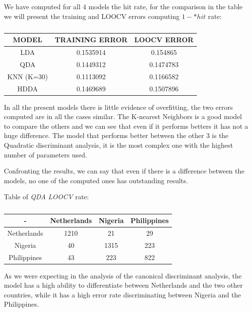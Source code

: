 \documentclass[
  11pt,
]{article}
\begin{document}
We have computed for all 4 models the hit rate, for the comparison in the table we will present the training and LOOCV errors computing \(1-*hit\) rate:

\begin{table}[h!]
  \begin{center}
  \caption{}
    \begin{tabular}{c|c|c} 
      \textbf{MODEL} & \textbf{TRAINING ERROR} & \textbf{LOOCV ERROR}\\
      \hline
        LDA & 0.1535914 & 0.154865\\
        QDA & 0.1449312 & 0.1474783\\
        KNN (K=30) & 0.1113092 & 0.1166582\\
        HDDA & 0.1469689 & 0.1507896\\
      \end{tabular}
    \end{center}
\end{table}

In all the present models there is little evidence of overfitting, the two errors computed are in all the cases similar. The K-nearest Neighbors is a good model to compare the others and we can see that even if it performs betters it has not a huge difference. The model that performs better between the other \(3\) is the Quadratic discriminant analysis, it is the most complex one with the highest number of parameters used.

Confronting the results, we can say that even if there is a difference between the models, no one of the computed ones has outstanding results.

Table of \emph{QDA LOOCV} rate:

\begin{table}[h!]
  \begin{center}
    \caption{}
      \begin{tabular}{c|c|c|c} 
      \textbf{ - } & \textbf{Netherlands} & \textbf{Nigeria} & \textbf{Philippines}\\
      \hline
        Netherlands & 1210 & 21 & 29\\
        Nigeria & 40 & 1315 & 223\\
        Philippines & 43 & 223 & 822\\
    \end{tabular}
  \end{center}
\end{table}

As we were expecting in the analysis of the canonical discriminant analysis, the model has a high ability to differentiate between Netherlands and the two other countries, while it has a high error rate discriminating between Nigeria and the Philippines.
\end{document}
